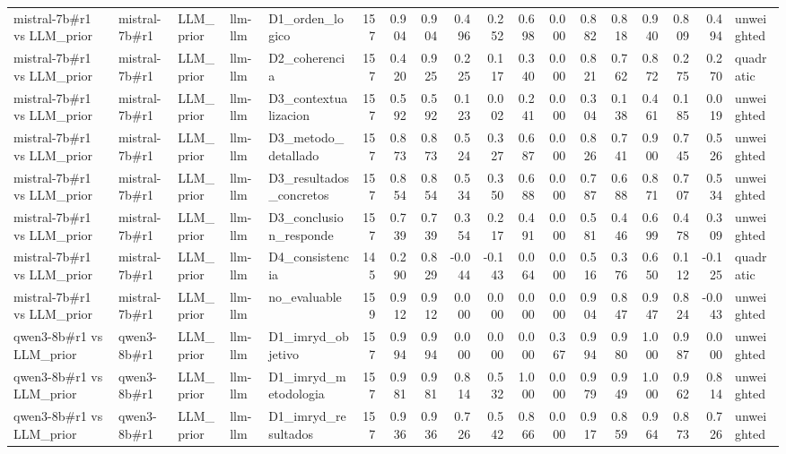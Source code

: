 \begin{table}
{\begin{tabular}{lllllrrrrrrrrrrrrl}
mistral-7b\#r1 vs LLM\_prior & mistral-7b\#r1 & LLM\_prior & llm-llm & D1\_orden\_logico & 157 & 0.904 & 0.904 & 0.496 & 0.252 & 0.698 & 0.000 & 0.882 & 0.818 & 0.940 & 0.809 & 0.494 & unweighted \\
mistral-7b\#r1 vs LLM\_prior & mistral-7b\#r1 & LLM\_prior & llm-llm & D2\_coherencia & 157 & 0.420 & 0.925 & 0.225 & 0.117 & 0.340 & 0.000 & 0.821 & 0.762 & 0.872 & 0.275 & 0.270 & quadratic \\
mistral-7b\#r1 vs LLM\_prior & mistral-7b\#r1 & LLM\_prior & llm-llm & D3\_contextualizacion & 157 & 0.592 & 0.592 & 0.123 & 0.002 & 0.241 & 0.000 & 0.304 & 0.138 & 0.461 & 0.185 & 0.019 & unweighted \\
mistral-7b\#r1 vs LLM\_prior & mistral-7b\#r1 & LLM\_prior & llm-llm & D3\_metodo\_detallado & 157 & 0.873 & 0.873 & 0.524 & 0.327 & 0.687 & 0.000 & 0.826 & 0.741 & 0.900 & 0.745 & 0.526 & unweighted \\
mistral-7b\#r1 vs LLM\_prior & mistral-7b\#r1 & LLM\_prior & llm-llm & D3\_resultados\_concretos & 157 & 0.854 & 0.854 & 0.534 & 0.350 & 0.688 & 0.000 & 0.787 & 0.688 & 0.871 & 0.707 & 0.534 & unweighted \\
mistral-7b\#r1 vs LLM\_prior & mistral-7b\#r1 & LLM\_prior & llm-llm & D3\_conclusion\_responde & 157 & 0.739 & 0.739 & 0.354 & 0.217 & 0.491 & 0.000 & 0.581 & 0.446 & 0.699 & 0.478 & 0.309 & unweighted \\
mistral-7b\#r1 vs LLM\_prior & mistral-7b\#r1 & LLM\_prior & llm-llm & D4\_consistencia & 145 & 0.290 & 0.829 & -0.044 & -0.143 & 0.064 & 0.000 & 0.516 & 0.376 & 0.650 & 0.112 & -0.125 & quadratic \\
mistral-7b\#r1 vs LLM\_prior & mistral-7b\#r1 & LLM\_prior & llm-llm & no\_evaluable & 159 & 0.912 & 0.912 & 0.000 & 0.000 & 0.000 & 0.000 & 0.904 & 0.847 & 0.947 & 0.824 & -0.043 & unweighted \\
qwen3-8b\#r1 vs LLM\_prior & qwen3-8b\#r1 & LLM\_prior & llm-llm & D1\_imryd\_objetivo & 157 & 0.994 & 0.994 & 0.000 & 0.000 & 0.000 & 0.367 & 0.994 & 0.980 & 1.000 & 0.987 & 0.000 & unweighted \\
qwen3-8b\#r1 vs LLM\_prior & qwen3-8b\#r1 & LLM\_prior & llm-llm & D1\_imryd\_metodologia & 157 & 0.981 & 0.981 & 0.814 & 0.532 & 1.000 & 0.000 & 0.979 & 0.949 & 1.000 & 0.962 & 0.814 & unweighted \\
qwen3-8b\#r1 vs LLM\_prior & qwen3-8b\#r1 & LLM\_prior & llm-llm & D1\_imryd\_resultados & 157 & 0.936 & 0.936 & 0.726 & 0.542 & 0.866 & 0.000 & 0.917 & 0.859 & 0.964 & 0.873 & 0.726 & unweighted \\

\end{tabular}}
\end{table}
